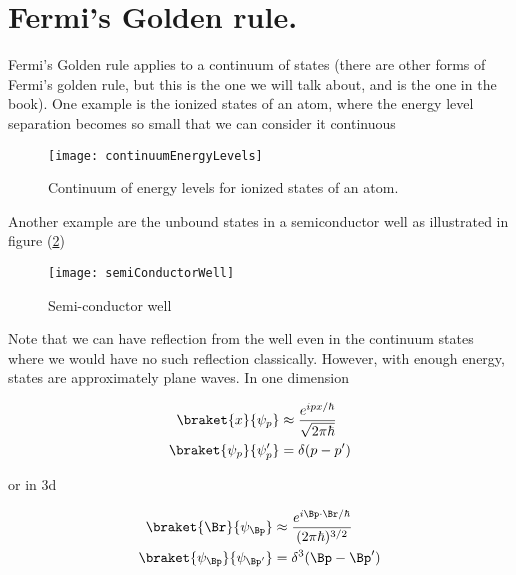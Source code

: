\section{Fermi's Golden rule.}

Fermi's Golden rule applies to a continuum of states (there are other forms of Fermi's golden rule, but this is the one we will talk about, and is the one in the book).  One example is the ionized states of an atom, where the energy level separation becomes so small that we can consider it continuous

\begin{figure}[htp]
   \centering
   \texttt{[image: continuumEnergyLevels]}
   \caption{Continuum of energy levels for ionized states of an atom.}\label{fig:qmTwoL10:continuumEnergyLevels}
\end{figure}

Another example are the unbound states in a semiconductor well as illustrated in figure (\ref{fig:qmTwoL10:semiConductorWell})
\begin{figure}[htp]
   \centering
   \texttt{[image: semiConductorWell]}
   \caption{Semi-conductor well}\label{fig:qmTwoL10:semiConductorWell}
\end{figure}

Note that we can have reflection from the well even in the continuum states where we would have no such reflection classically.  However, with enough energy, states are approximately plane waves.  In one dimension

\begin{equation}\label{eqn:qmTwoL10:n}
\begin{aligned}
\braket{x}{\psi_p} &\approx \frac{e^{i p x/\hbar}}{\sqrt{2 \pi \hbar}} \\
\braket{\psi_p}{\psi_p'} &= \delta(p - p')
\end{aligned}
\end{equation}

or in 3d

\begin{equation}\label{eqn:qmTwoL10:n}
\begin{aligned}
\braket{\Br}{\psi_{\Bp}} &\approx \frac{e^{i \Bp \cdot \Br/\hbar}}{(2 \pi \hbar)^{3/2} } \\
\braket{\psi_{\Bp}}{\psi_{\Bp'}} &= \delta^3(\Bp - \Bp')
\end{aligned}
\end{equation}


